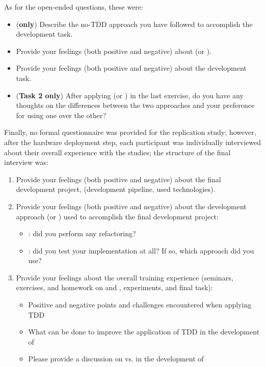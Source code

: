 \noindent As for the open-ended questions, these were:
\begin{itemize}
    \item (\textbf{\notdd only}) Describe the no-TDD approach you have followed to accomplish the development task.
    \item Provide your feelings (both positive and negative) about (\ie \tdd or \notdd).
    \item Provide your feelings (both positive and negative) about the development task.
    \item (\textbf{Task 2 only}) After applying (\ie \tdd or \notdd) in the last exercise, do you have any thoughts on the differences between the two approaches and your preference for using one over the other?
\end{itemize}

\noindent Finally, no formal questionnaire was provided for the replication study; however, after the hardware deployment step, each participant was individually interviewed about their overall experience with the studies; the structure of the final interview was:
\begin{enumerate}
    \item Provide your feelings (both positive and negative) about the final development project, (\eg development pipeline, used technologies).
    \item Provide your feelings (both positive and negative) about the development approach (\ie \tdd or \notdd) used to accomplish the final development project:
        \begin{itemize}
            \item \tdd: did you perform any refactoring? 
            \item \notdd: did you test your implementation at all? If so, which approach did you use?
        \end{itemize}
    \item Provide your feelings about the overall training experience (seminars, exercises, and homework on \tdd and \notdd, experiments, and final task):
        \begin{itemize}
            \item Positive and negative points and challenges encountered when applying TDD
            \item What can be done to improve the application of TDD in the development of \ess
            \item Please provide a discussion on \tdd vs. \notdd in the development of \ess
        \end{itemize}
\end{enumerate}





